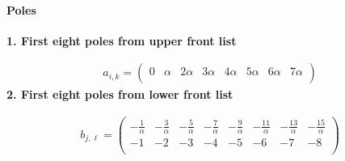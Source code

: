 \documentclass[11pt]{article}
\begin{document}
\paragraph{Poles}

\noindent\textbf{1. First eight poles from upper front list}

\begin{align*}
  a_{i,k} = 
  \left(
\begin{array}{cccccccc}
 0 & \alpha  & 2 \alpha  & 3 \alpha  & 4 \alpha  & 5 \alpha  & 6 \alpha  & 7 \alpha  \\
\end{array}
\right)
\end{align*}
\noindent\textbf{2. First eight poles from lower front list}

\begin{align*}
  b_{j,\ell} = 
  \left(
\begin{array}{cccccccc}
 -\frac{1}{\alpha } & -\frac{3}{\alpha } & -\frac{5}{\alpha } & -\frac{7}{\alpha } & -\frac{9}{\alpha } & -\frac{11}{\alpha } & -\frac{13}{\alpha } & -\frac{15}{\alpha } \\
 -1 & -2 & -3 & -4 & -5 & -6 & -7 & -8 \\
\end{array}
\right)
\end{align*}
\end{document}
